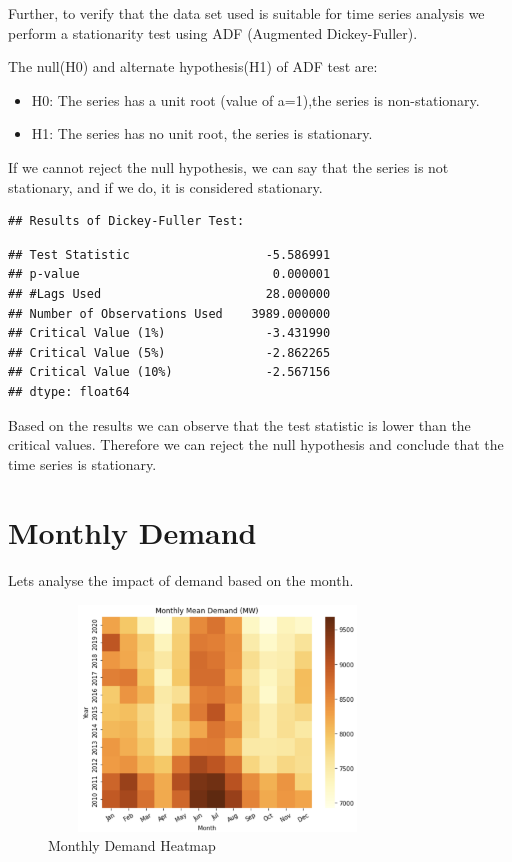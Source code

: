 \documentclass[mstat,12pt]{unswthesis}
\begin{document}
Further, to verify that the data set used is suitable for time series
analysis we perform a stationarity test using ADF (Augmented
Dickey-Fuller).

The null(H0) and alternate hypothesis(H1) of ADF test are:

\begin{itemize}
  \item H0: The series has a unit root (value of a=1),the series is non-stationary.
  \item H1: The series has no unit root, the series is stationary.
\end{itemize}

If we cannot reject the null hypothesis, we can say that the series is
not stationary, and if we do, it is considered stationary.

\begin{verbatim}
## Results of Dickey-Fuller Test:
\end{verbatim}

\begin{verbatim}
## Test Statistic                   -5.586991
## p-value                           0.000001
## #Lags Used                       28.000000
## Number of Observations Used    3989.000000
## Critical Value (1%)              -3.431990
## Critical Value (5%)              -2.862265
## Critical Value (10%)             -2.567156
## dtype: float64
\end{verbatim}

Based on the results we can observe that the test statistic is lower
than the critical values. Therefore we can reject the null hypothesis
and conclude that the time series is stationary.

\section{Monthly Demand}\label{monthly-demand}

Lets analyse the impact of demand based on the month.

\begin{figure}[H]
\centering
\includegraphics[width=0.80\textwidth,height=6cm]{monthly_heat.png}
\caption{Monthly Demand Heatmap}
\label{monthly_heat.png}
\end{figure}
\end{document}
